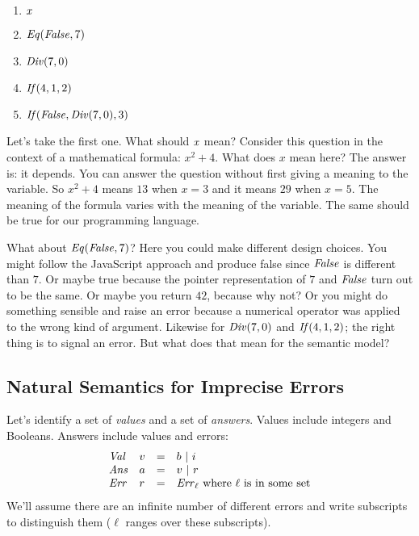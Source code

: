 \begin{enumerate}\setlength{\itemsep}{0pt}
\item $\mathit{x}$
\item $\mathit{Eq}(\mathit{False},7)$
\item $\mathit{Div}(7,0)$
\item $\mathit{If}(4,1,2)$
\item $\mathit{If}(\mathit{False},\mathit{Div}(7,0),3)$
\end{enumerate}

Let's take the first one.  What should $\mathit{x}$ mean?  Consider this
question in the context of a mathematical formula: $x^2+4$.  What does
$x$ mean here?  The answer is: it depends.  You can answer the
question without first giving a meaning to the variable.  So $x^2+4$
means $13$ when $x=3$ and it means $29$ when $x=5$.  The meaning of
the formula varies with the meaning of the variable.  The same should
be true for our programming language.

What about $\mathit{Eq}(\mathit{False},7)$?  Here you could make different design
choices.  You might follow the JavaScript approach and produce false
since $\mathit{False}$ is different than $7$.  Or maybe true because the
pointer representation of $7$ and $\mathit{False}$ turn out to be the same.
Or maybe you return $42$, because why not?  Or you might do something
sensible and raise an error because a numerical operator was applied
to the wrong kind of argument.  Likewise for $\mathit{Div}(7,0)$ and
$\mathit{If}(4,1,2)$; the right thing is to signal an error.  But what does
that mean for the semantic model?

\subsection{Natural Semantics for Imprecise Errors}

Let's identify a set of \emph{values} and a set of \emph{answers}.
Values include integers and Booleans.  Answers include values and
errors:
\[
\begin{array}{llcl}
\mathit{Val} & v & = & b\ |\ i\\
\mathit{Ans} & a & = & v\ |\ r\\
\mathit{Err} & r & = & \mathit{Err}_\ell \text{ where $\ell$ is in some set}
\end{array}
\]
We'll assume there are an infinite number of different errors and
write subscripts to distinguish them ($\ell$ ranges over these subscripts).


